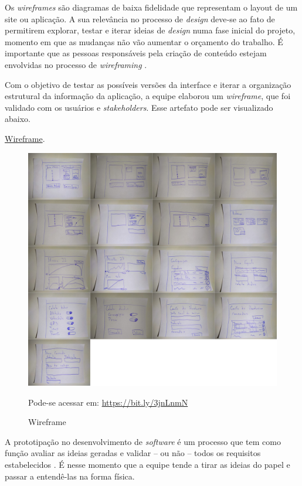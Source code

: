 
Os \textit{wireframes} são diagramas de baixa fidelidade que representam o layout de um site ou aplicação. A sua relevância no processo de \textit{design} deve‐se ao fato de permitirem explorar, testar e iterar ideias de \textit{design} numa fase inicial do projeto, momento em que as mudanças não vão aumentar o orçamento do trabalho. É importante que as pessoas responsáveis pela criação de conteúdo estejam envolvidas no processo de \textit{wireframing} \cite{brito2016usabilidade}. 

Com o objetivo de testar as possíveis versões da interface e iterar a organização estrutural da informação da aplicação, a equipe elaborou um \textit{wireframe}, que foi validado com os usuários e \textit{stakeholders}. Esse artefato pode ser visualizado abaixo.

\href{https://bit.ly/3jnLnmN}{Wireframe}.

\begin{figure}[H]
\centering
\includegraphics[scale=0.2]{figuras/wireframe.png}  
\caption{Wireframe}
\footnotesize Pode-se acessar em: \url{https://bit.ly/3jnLnmN}
\label{fig:Wireframe}
\end{figure}


A prototipação no desenvolvimento de \textit{software} é um processo que tem como função avaliar as ideias geradas e validar – ou não – todos os requisitos estabelecidos \cite{lilley2004development}. É nesse momento que a equipe tende a  tirar as ideias do papel e passar a entendê-las na forma física.

